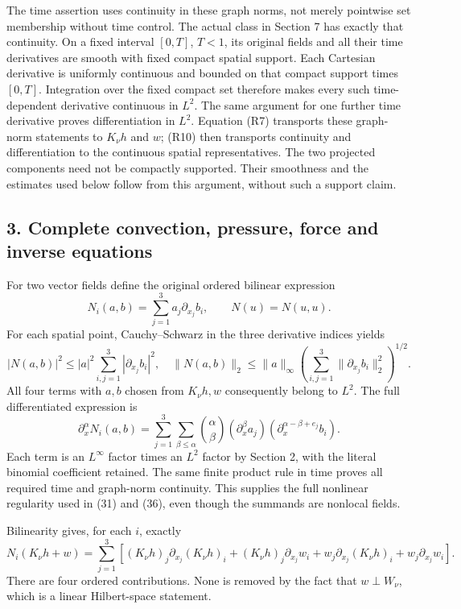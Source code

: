 The time assertion uses continuity in these graph norms, not merely pointwise set membership without time control. The actual class in Section 7 has exactly that continuity. On a fixed interval \([0,T]\), \(T<1\), its original fields and all their time derivatives are smooth with fixed compact spatial support. Each Cartesian derivative is uniformly continuous and bounded on that compact support times \([0,T]\). Integration over the fixed compact set therefore makes every such time-dependent derivative continuous in \(L^2\). The same argument for one further time derivative proves differentiation in \(L^2\). Equation (R7) transports these graph-norm statements to \(K_\nu h\) and \(w\); (R10) then transports continuity and differentiation to the continuous spatial representatives. The two projected components need not be compactly supported. Their smoothness and the estimates used below follow from this argument, without such a support claim.

\subsection*{3. Complete convection, pressure, force and inverse equations}

For two vector fields define the original ordered bilinear expression \[
N_i(a,b)=\sum_{j=1}^3a_j\partial_{x_j}b_i,
\qquad N(u)=N(u,u).
\tag{R11}
\] For each spatial point, Cauchy--Schwarz in the three derivative indices yields \[
|N(a,b)|^2\le |a|^2\sum_{i,j=1}^3|\partial_{x_j}b_i|^2,
\quad
\|N(a,b)\|_2\le\|a\|_\infty
\left(\sum_{i,j=1}^3\|\partial_{x_j}b_i\|_2^2\right)^{1/2}.
\tag{R12}
\] All four terms with \(a,b\) chosen from \(K_\nu h,w\) consequently belong to \(L^2\). The full differentiated expression is \[
\partial_x^\alpha N_i(a,b)
=\sum_{j=1}^3\sum_{\beta\le\alpha}
\binom\alpha\beta
(\partial_x^\beta a_j)
(\partial_x^{\alpha-\beta+e_j}b_i).
\tag{R13}
\] Each term is an \(L^\infty\) factor times an \(L^2\) factor by Section 2, with the literal binomial coefficient retained. The same finite product rule in time proves all required time and graph-norm continuity. This supplies the full nonlinear regularity used in (31) and (36), even though the summands are nonlocal fields.

Bilinearity gives, for each \(i\), exactly \[
N_i(K_\nu h+w)=\sum_{j=1}^3\left[
(K_\nu h)_j\partial_{x_j}(K_\nu h)_i
+(K_\nu h)_j\partial_{x_j}w_i
+w_j\partial_{x_j}(K_\nu h)_i
+w_j\partial_{x_j}w_i\right].
\tag{R14}
\] There are four ordered contributions. None is removed by the fact that \(w\perp W_\nu\), which is a linear Hilbert-space statement.

